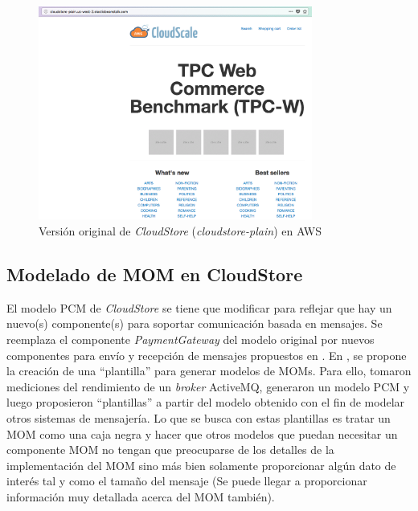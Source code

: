 \documentclass[article]{IEEEtran}
\begin{document}
\begin{figure}[h]
  \centering
  \includegraphics[width=9cm]{aws-cs-plain}
  \caption{\small{Versión original de \emph{CloudStore} (\emph{cloudstore-plain}) en AWS}}
  \label{fig:aws-cs-plain}
\end{figure}

\subsection{Modelado de MOM en CloudStore} \label{sec:cloudstore-mom}
El modelo PCM de \emph{CloudStore} se tiene que modificar para reflejar que hay un nuevo(s) componente(s) para soportar comunicación basada en mensajes. Se reemplaza el componente \emph{PaymentGateway} del modelo original por nuevos componentes para envío y recepción de mensajes propuestos en \cite{happe-et-al}. En \cite{happe-et-al}, se propone la creación de una ``plantilla'' para generar modelos de MOMs. Para ello, tomaron mediciones del rendimiento de un \emph{broker} ActiveMQ, generaron un modelo PCM y luego proposieron ``plantillas'' a partir del modelo obtenido con el fin de modelar otros sistemas de mensajería. Lo que se busca con estas plantillas es tratar un MOM como una caja negra y hacer que otros modelos que puedan necesitar un componente MOM no tengan que preocuparse de los detalles de la implementación del MOM sino más bien solamente proporcionar algún dato de interés tal y como el tamaño del mensaje (Se puede llegar a proporcionar información muy detallada acerca del MOM también).
\end{document}
